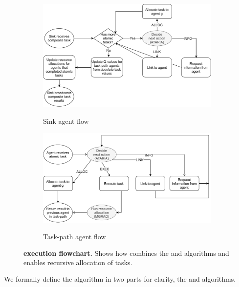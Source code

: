 \begin{figure}[ht]
	\centering
	\begin{subfigure}{0.75\textwidth}
		\centering
		\caption{Sink agent flow}
		\includegraphics[width=0.9\linewidth, trim={25pt 0pt 25pt 0pt, clip}]{algorithm-flow-sink}
		\label{fig:algorithm-flow-sink}
	\end{subfigure} \hfill%
	\begin{subfigure}{0.75\textwidth}
		\caption{Task-path agent flow}
		\centering	\includegraphics[width=0.9\linewidth,trim={25pt 0pt 25pt 0pt, clip}]{algorithm-flow-arc}
		\label{fig:algorithm-flow-arc}
	\end{subfigure}
	\caption{\textbf{\acronymWSNOptimisation{}{} execution flowchart.} Shows how \acronymWSNOptimisation{}{} combines the \acronymATARIA{}{} and \acronymMGRAO{}{} algorithms and enables recursive allocation of tasks.}
	\label{fig:algorithm-flow}
\end{figure}
We formally define the \acronymWSNOptimisation{}{} algorithm in two parts for clarity, the \acronymWSNOptimisationSink{}{} and \acronymWSNOptimisationArc{}{} algorithms.
